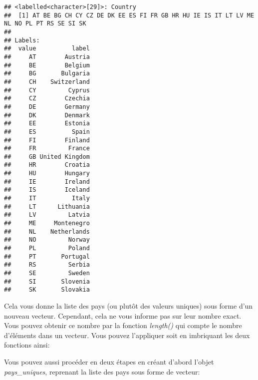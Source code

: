 \documentclass[
]{book}
\newenvironment{Shaded}{\begin{snugshade}}{\end{snugshade}}
\newcommand{\FunctionTok}[1]{\textcolor[rgb]{0.00,0.00,0.00}{#1}}
\newcommand{\NormalTok}[1]{#1}
\newcommand{\OtherTok}[1]{\textcolor[rgb]{0.56,0.35,0.01}{#1}}
\newcommand{\SpecialCharTok}[1]{\textcolor[rgb]{0.00,0.00,0.00}{#1}}
\begin{document}
\begin{verbatim}
## <labelled<character>[29]>: Country
##  [1] AT BE BG CH CY CZ DE DK EE ES FI FR GB HR HU IE IS IT LT LV ME NL NO PL PT RS SE SI SK
## 
## Labels:
##  value          label
##     AT        Austria
##     BE        Belgium
##     BG       Bulgaria
##     CH    Switzerland
##     CY         Cyprus
##     CZ        Czechia
##     DE        Germany
##     DK        Denmark
##     EE        Estonia
##     ES          Spain
##     FI        Finland
##     FR         France
##     GB United Kingdom
##     HR        Croatia
##     HU        Hungary
##     IE        Ireland
##     IS        Iceland
##     IT          Italy
##     LT      Lithuania
##     LV         Latvia
##     ME     Montenegro
##     NL    Netherlands
##     NO         Norway
##     PL         Poland
##     PT       Portugal
##     RS         Serbia
##     SE         Sweden
##     SI       Slovenia
##     SK       Slovakia
\end{verbatim}

Cela vous donne la liste des pays (ou plutôt des valeurs uniques) sous forme d'un nouveau vecteur. Cependant, cela ne vous informe pas sur leur nombre exact. Vous pouvez obtenir ce nombre par la fonction \emph{length()} qui compte le nombre d'éléments dans un vecteur. Vous pouvez l'appliquer soit en imbriquant les deux fonctions ainsi:

\begin{Shaded}
\end{Shaded}

Vous pouvez aussi procéder en deux étapes en créant d'abord l'objet \emph{pays\_uniques}, reprenant la liste des pays sous forme de vecteur:

\begin{Shaded}
\end{Shaded}
\end{document}
